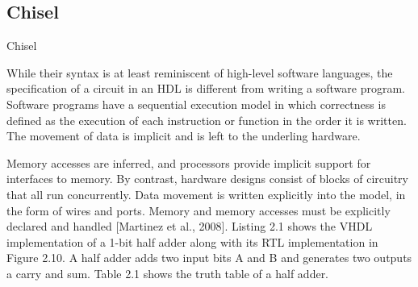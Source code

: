 \subsection{Chisel}
Chisel~\cite{chisel}
%





While their syntax is at least reminiscent of high-level software languages, the specification of a circuit in an HDL is different from writing a software program. Software programs have a sequential execution model in which correctness is defined as the execution of each instruction or function in the order it is written.
The movement of data is implicit and is left to the underling hardware.

Memory accesses are inferred, and processors provide implicit support for interfaces to memory. By contrast, hardware designs consist of blocks of circuitry that all run concurrently. Data movement is written explicitly into the model, in the form of wires and ports. Memory and memory accesses must be explicitly declared and handled [Martinez et al., 2008]. Listing 2.1 shows the VHDL implementation of a 1-bit half adder along with its RTL implementation in Figure 2.10. A half adder adds two input bits A and B and generates two outputs a carry and sum. Table 2.1 shows the truth table of a half adder.











